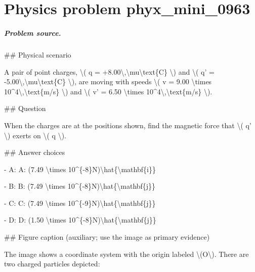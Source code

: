 
\chapter{Physics problem phyx\_mini\_0963}
\label{ch:PhyXMiniProblems_problem_phyx_mini_0963}

\paragraph{Problem source.}
\#\# Physical scenario

A pair of point charges, \textbackslash{}( q = +8.00\textbackslash{},\textbackslash{}mu\textbackslash{}text\{C\} \textbackslash{}) and \textbackslash{}( q' = -5.00\textbackslash{},\textbackslash{}mu\textbackslash{}text\{C\} \textbackslash{}), are moving with speeds \textbackslash{}( v = 9.00 \textbackslash{}times 10\textasciicircum{}4\textbackslash{},\textbackslash{}text\{m/s\} \textbackslash{}) and \textbackslash{}( v' = 6.50 \textbackslash{}times 10\textasciicircum{}4\textbackslash{},\textbackslash{}text\{m/s\} \textbackslash{}).

\#\# Question

When the charges are at the positions shown, find the magnetic force that \textbackslash{}( q' \textbackslash{}) exerts on \textbackslash{}( q \textbackslash{}).

\#\# Answer choices

- A: A: (7.49 \textbackslash{}times 10\textasciicircum{}\{-8\}N)\textbackslash{}hat\{\textbackslash{}mathbf\{i\}\}

- B: B: (7.49 \textbackslash{}times 10\textasciicircum{}\{-8\}N)\textbackslash{}hat\{\textbackslash{}mathbf\{j\}\}

- C: C: (7.49 \textbackslash{}times 10\textasciicircum{}\{-9\}N)\textbackslash{}hat\{\textbackslash{}mathbf\{j\}\}

- D: D: (1.50 \textbackslash{}times 10\textasciicircum{}\{-8\}N)\textbackslash{}hat\{\textbackslash{}mathbf\{j\}\}

\#\# Figure caption (auxiliary; use the image as primary evidence)

The image shows a coordinate system with the origin labeled \textbackslash{}(O\textbackslash{}). There are two charged particles depicted:

